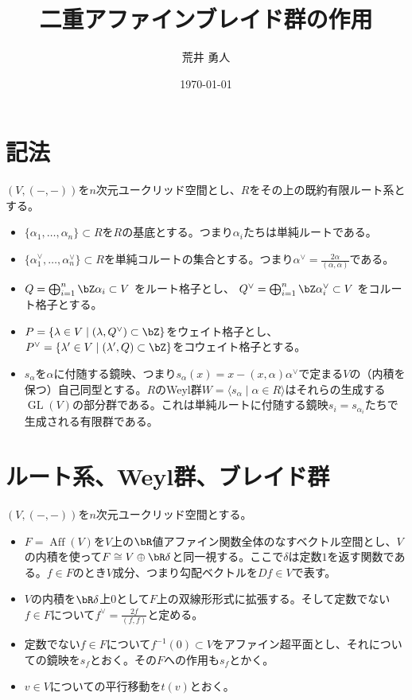 \documentclass[uplatex, a4paper, dvipdfmx]{jsarticle}
\title{二重アファインブレイド群の作用}
\author{荒井 勇人}
\date{\today}
\theoremstyle{definition}
\DeclareMathOperator{\GL}{\mathrm{GL}}
\DeclareMathOperator{\Aff}{\mathrm{Aff}}
\begin{document}
\maketitle



\section{記法}
$(V,(-, -))$を$n$次元ユークリッド空間とし、$R$をその上の既約有限ルート系とする。
\begin{itemize}
    \item $\{\alpha_1, \dots, \alpha_n\} \subset R$を$R$の基底とする。つまり$\alpha_i$たちは単純ルートである。
    \item $\{\alpha_1^\vee, \dots, \alpha_n^\vee\} \subset R$を単純コルートの集合とする。つまり$\alpha^\vee = \frac{2\alpha}{(\alpha, \alpha)}$である。
    \item $Q = \bigoplus_{i = 1}^n \bZ \alpha_i \subset V$ をルート格子とし、 $Q^\vee = \bigoplus_{i = 1}^n \bZ \alpha_i^\vee \subset V$ をコルート格子とする。
    \item $P = \{\lambda \in V \mid (\lambda, Q^\vee) \subset \bZ\}$をウェイト格子とし、$P^\vee = \{\lambda' \in V \mid (\lambda', Q) \subset \bZ\}$をコウェイト格子とする。
    \item $s_\alpha$を$\alpha$に付随する鏡映、つまり$s_\alpha(x) = x - (x, \alpha)\alpha^\vee$で定まる$V$の（内積を保つ）自己同型とする。$R$のWeyl群$W = \langle s_\alpha \mid \alpha \in R \rangle$はそれらの生成する$\GL(V)$の部分群である。これは単純ルートに付随する鏡映$s_i = s_{\alpha_i}$たちで生成される有限群である。
\end{itemize}
\section{ルート系、Weyl群、ブレイド群}
$(V,(-, -))$を$n$次元ユークリッド空間とする。
\begin{itemize}
    \item $F=\Aff(V)$を$V$上の$\bR$値アファイン関数全体のなすベクトル空間とし、$V$の内積を使って$F \cong V \oplus \bR \delta$と同一視する。ここで$\delta$は定数$1$を返す関数である。$f \in F$のとき$V$成分、つまり勾配ベクトルを$Df \in V$で表す。
    \item $V$の内積を$\bR \delta$上$0$として$F$上の双線形形式に拡張する。そして定数でない$f \in F$について$f^\vee = \frac{2f}{(f, f)}$と定める。
    \item 定数でない$f \in F$について$f^{-1}(0) \subset V$をアファイン超平面とし、それについての鏡映を$s_f$とおく。その$F$への作用も$s_f$とかく。
    \item $v \in V$についての平行移動を$t(v)$とおく。
\end{itemize}
\end{document}
